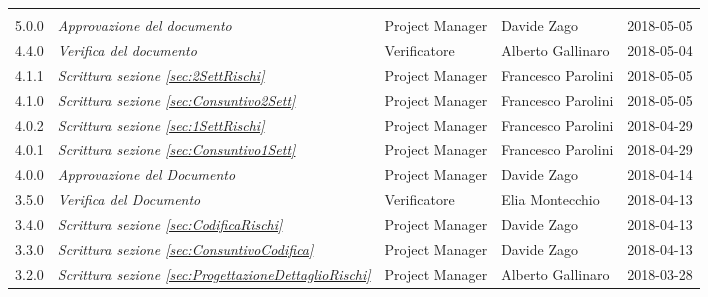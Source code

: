\newpage 
\section*{}
	\begin{longtable}[H]{C{2cm}|C{4cm}|C{3cm}|C{3cm}|R{2cm}}
		
		 & & & &  \\
		
		
		5.0.0 &\emph{Approvazione del documento} & Project Manager & Davide Zago & 2018-05-05 \\
		\hline
		
		4.4.0 &\emph{Verifica del documento} & Verificatore & Alberto Gallinaro & 2018-05-04 \\
		\hline
		
		4.1.1 &\emph{Scrittura sezione \ref{sec:2SettRischi}} & Project Manager & Francesco Parolini & 2018-05-05 \\
		\hline
		
		4.1.0 &\emph{Scrittura sezione \ref{sec:Consuntivo2Sett}} & Project Manager & Francesco Parolini & 2018-05-05 \\
		\hline
		
		4.0.2 &\emph{Scrittura sezione \ref{sec:1SettRischi}} & Project Manager & Francesco Parolini & 2018-04-29 \\
		\hline
			
		4.0.1 &\emph{Scrittura sezione \ref{sec:Consuntivo1Sett}} & Project Manager & Francesco Parolini & 2018-04-29 \\
		\hline
		
		4.0.0 &\emph{Approvazione del Documento} & Project Manager & Davide Zago & 2018-04-14 \\
		\hline
		
		3.5.0 &\emph{Verifica del Documento} & Verificatore & Elia Montecchio & 2018-04-13 \\
		\hline
		
		3.4.0 &\emph{Scrittura sezione \ref{sec:CodificaRischi}} & Project Manager &  Davide Zago & 2018-04-13 \\
		\hline
		
		3.3.0 &\emph{Scrittura sezione \ref{sec:ConsuntivoCodifica}} & Project Manager &  Davide Zago & 2018-04-13 \\
		\hline

		3.2.0 &\emph{Scrittura sezione \ref{sec:ProgettazioneDettaglioRischi}} & Project Manager & Alberto Gallinaro & 2018-03-28 \\
		\hline	
		

\end{longtable}

